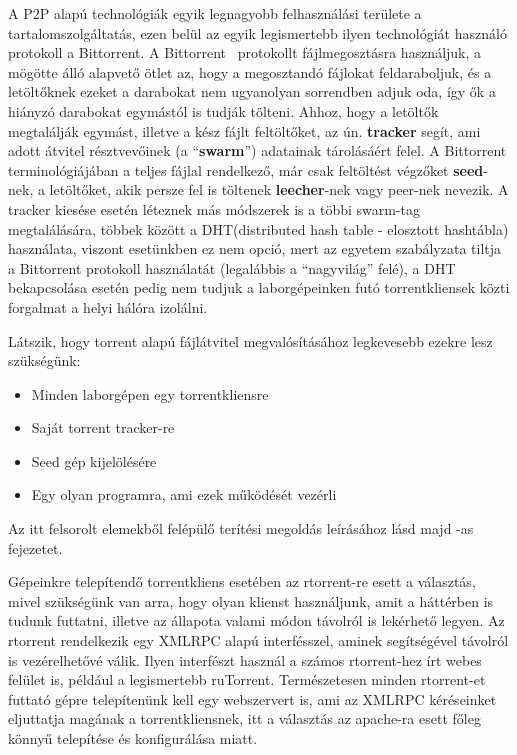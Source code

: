 A P2P alapú technológiák egyik legnagyobb felhasználási területe a tartalomszolgáltatás, ezen belül
az egyik legismertebb ilyen technológiát használó protokoll a Bittorrent. A Bittorrent~\cite{cohen2008bittorrent} protokollt
fájlmegosztásra használjuk, a mögötte álló alapvető ötlet az, hogy a megosztandó fájlokat
feldaraboljuk, és a letöltőknek ezeket a darabokat nem ugyanolyan sorrendben adjuk oda, így ők a
hiányzó darabokat egymástól is tudják tölteni. Ahhoz, hogy a letöltők megtalálják egymást, illetve a kész fájlt feltöltőket, az ún. \textbf{tracker} segít, ami adott átvitel résztvevőinek (a ``\textbf{swarm}'') adatainak tárolásáért felel. A Bittorrent terminológiájában a teljes fájlal rendelkező, már csak feltöltést végzőket \textbf{seed}-nek, a letöltőket, akik persze fel is töltenek \textbf{leecher}-nek vagy peer-nek nevezik. A tracker kiesése esetén léteznek más módszerek is a többi swarm-tag megtalálására, többek között a DHT\cite{rescorla2006introduction}(distributed hash table - elosztott hashtábla) használata, viszont esetünkben ez nem opció, mert az egyetem szabályzata tiltja a Bittorrent protokoll használatát (legalábbis a ``nagyvilág'' felé), a DHT bekapcsolása esetén pedig nem tudjuk a laborgépeinken futó torrentkliensek közti forgalmat a helyi hálóra izolálni.

Látszik, hogy torrent alapú fájlátvitel megvalósításához legkevesebb ezekre lesz szükségünk:
\begin{itemize}
	\item Minden laborgépen egy torrentkliensre
	\item Saját torrent tracker-re
	\item Seed gép kijelölésére
	\item Egy olyan programra, ami ezek működését vezérli
\end{itemize}
Az itt felsorolt elemekből felépülő terítési megoldás leírásához lásd majd -as fejezetet. 

Gépeinkre telepítendő torrentkliens esetében az rtorrent-re\cite{sundell2012libtorrent} esett a választás, mivel szükségünk van arra, hogy olyan klienst használjunk, amit a háttérben is tudunk futtatni, illetve az állapota valami módon távolról is lekérhető legyen. Az rtorrent rendelkezik egy XMLRPC\cite{merrick2006xml} alapú interfésszel, aminek segítségével távolról is vezérelhetővé válik. Ilyen interfészt használ a számos rtorrent-hez írt webes felület is, például a legismertebb ruTorrent\cite{rutorrent}. Természetesen minden rtorrent-et futtató gépre telepítenünk kell egy webszervert is, ami az XMLRPC kéréseinket eljuttatja magának a torrentkliensnek, itt a választás az apache-ra\cite{fielding1997apache} esett főleg könnyű telepítése és konfigurálása miatt.

